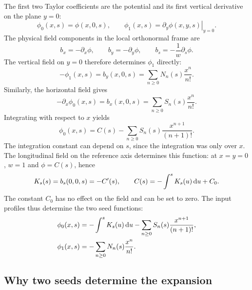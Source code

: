 The first two Taylor coefficients are the potential and its first vertical
derivative on the plane \(y=0\):
\begin{equation}
 \phi_0(x,s)=\phi(x,0,s),\qquad
 \phi_1(x,s)=\left.\partial_y\phi(x,y,s)\right|_{y=0}.
\end{equation}
The physical field components in the local orthonormal frame are
\begin{equation}
 b_x=-\partial_x\phi,\qquad b_y=-\partial_y\phi,\qquad
 b_s=-\frac{1}{w}\partial_s\phi.
 \label{bfe:field}
\end{equation}
The vertical field on \(y=0\) therefore determines \(\phi_1\) directly:
\begin{equation}
 -\phi_1(x,s)=b_y(x,0,s)=\sum_{n\geq0}N_n(s)\frac{x^n}{n!}.
\end{equation}
Similarly, the horizontal field gives
\begin{equation}
 -\partial_x\phi_0(x,s)=b_x(x,0,s)
                       =\sum_{n\geq0}S_n(s)\frac{x^n}{n!}.
\end{equation}
Integrating with respect to \(x\) yields
\begin{equation}
 \phi_0(x,s)=C(s)-\sum_{n\geq0}S_n(s)\frac{x^{n+1}}{(n+1)!}.
\end{equation}
The integration constant can depend on \(s\), since the integration was
only over \(x\). The longitudinal field on the reference axis determines
this function: at \(x=y=0\), \(w=1\) and \(\phi=C(s)\), hence
\begin{equation}
 K_s(s)=b_s(0,0,s)=-C'(s),\qquad
 C(s)=-\int^s K_s(u)\,\text{d} u+C_0.
\end{equation}
The constant \(C_0\) has no effect on the field and can be set to zero.
The input profiles thus determine the two seed functions:
\begin{align}
 \phi_0(x,s)&=-\int^s K_s(u)\,\text{d} u
              -\sum_{n\geq0}S_n(s)\frac{x^{n+1}}{(n+1)!},\\
 \phi_1(x,s)&=-\sum_{n\geq0}N_n(s)\frac{x^n}{n!}.
 \label{bfe:seeds}
\end{align}
\subsection{Why two seeds determine the expansion}


